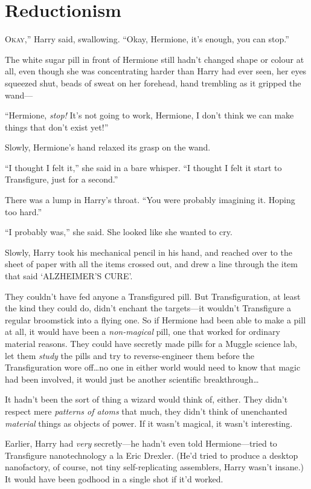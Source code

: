 \chapter{Reductionism}

\lettrine[ante=“]{O}{kay},” Harry said, swallowing. “Okay, Hermione, it’s enough, you can stop.”

The white sugar pill in front of Hermione still hadn’t changed shape or colour at all, even though she was concentrating harder than Harry had ever seen, her eyes squeezed shut, beads of sweat on her forehead, hand trembling as it gripped the wand—

“Hermione, \emph{stop!} It’s not going to work, Hermione, I don’t think we can make things that don’t exist yet!”

Slowly, Hermione’s hand relaxed its grasp on the wand.

“I thought I felt it,” she said in a bare whisper. “I thought I felt it start to Transfigure, just for a second.”

There was a lump in Harry’s throat. “You were probably imagining it. Hoping too hard.”

“I probably was,” she said. She looked like she wanted to cry.

Slowly, Harry took his mechanical pencil in his hand, and reached over to the sheet of paper with all the items crossed out, and drew a line through the item that said ‘ALZHEIMER’S CURE’.

They couldn’t have fed anyone a Transfigured pill. But Transfiguration, at least the kind they could do, didn’t enchant the targets—it wouldn’t Transfigure a regular broomstick into a flying one. So if Hermione had been able to make a pill at all, it would have been a \emph{non-magical} pill, one that worked for ordinary material reasons. They could have secretly made pills for a Muggle science lab, let them \emph{study} the pills and try to reverse-engineer them before the Transfiguration wore off…no one in either world would need to know that magic had been involved, it would just be another scientific breakthrough…

It hadn’t been the sort of thing a wizard would think of, either. They didn’t respect mere \emph{patterns of atoms} that much, they didn’t think of unenchanted \emph{material} things as objects of power. If it wasn’t magical, it wasn’t interesting.

Earlier, Harry had \emph{very} secretly—he hadn’t even told Hermione—tried to Transfigure nanotechnology a la Eric Drexler. (He’d tried to produce a desktop nanofactory, of course, not tiny self-replicating assemblers, Harry wasn’t insane.) It would have been godhood in a single shot if it’d worked.

